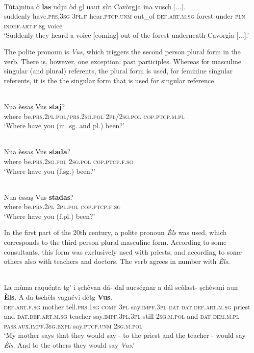 \ea

\\
\gll Tùtajnina ò \textbf{las} udju òd gl uaut ṣùt Cavòrgja ina vusch [...].\\
suddenly have.\textsc{prs.3sg} \textsc{3pl.f} hear.\textsc{ptcp.unm} out\_of \textsc{def.art.m.sg} forest under \textsc{pln} \textsc{indef.art.f.s}g voice\\
\glt `Suddenly they heard a voice [coming] out of the forest underneath Cavorgia [...].'
\z

The polite pronoun is \textit{Vus}, which triggers the second person plural form in the verb. There is, however, one exception: past participles. Whereas for masculine singular (and plural) referents, the plural form is used, for feminine singular referents, it is the the singular form that is used for singular reference.

\ea

\\
\gll  Nua èssaṣ Vus \textbf{staj}?\\
 where be.\textsc{prs.2pl.pol/prs.2sg.pol} \textsc{2pl/2sg.pol} \textsc{cop.ptcp.m.pl}\\
\glt `Where have you (m. sg. and pl.) been?'
\z

\ea

\\
\gll Nua èssaṣ Vus \textbf{stada}?\\
where be.\textsc{prs.2sg.pol} \textsc{2sg.pol} \textsc{cop.ptcp.f.sg}\\
\glt `Where have you (f.sg.) been?'
\z

\ea

\\
\gll Nua èssaṣ Vus \textbf{stadas}?\\
where be.\textsc{prs.2pl} \textsc{2pl.pol} \textsc{cop.ptcp.f.sg}\\
\glt `Where have you (f.pl.) been?'
\z

In the first part of the 20th century, a polite pronoun \textit{Èls} was used, which corresponds to the third person plural masculine form. According to some consultants, this form was exclusively used with priests, and according to some others also with teachers and doctors. The verb agrees in number with \textit{Èls}.

\ea

\\
\gll La mùma raquénta tg' i ṣchèvan dá- dal aucsé̱gnar a dál scòlast- ṣchèvani aun \textbf{Èls}. A da tschèls vagnévi détg \textbf{Vus}.\\
\textsc{def.art.f.sg} mother tell.\textsc{prs.1sg} \textsc{comp} \textsc{3pl} say.\textsc{impf.3pl} \textsc{dat} \textsc{dat.def.art.m.sg} priest and \textsc{dat.def.art.m.sg} teacher say.\textsc{impf.3pl.3pl} still \textsc{2sg.m.pol} and \textsc{dat} \textsc{dem.m.pl} \textsc{pass.aux.impf.3sg.expl} say.\textsc{ptcp.unm} \textsc{2sg.m.pol}\\
\glt `My mother says that they would say - to the priest and the teacher - would say \textit{Èls}. And to the others they would say \textit{Vus}.'
\z

